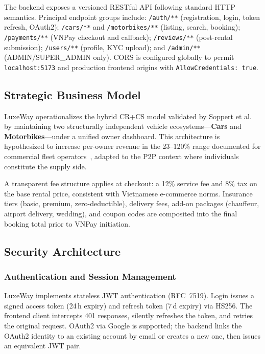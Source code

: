The backend exposes a versioned RESTful API following standard HTTP
semantics. Principal endpoint groups include: \texttt{/auth/**}
(registration, login, token refresh, OAuth2); \texttt{/cars/**} and
\texttt{/motorbikes/**} (listing, search, booking); \texttt{/payments/**}
(VNPay checkout and callback); \texttt{/reviews/**} (post-rental
submission); \texttt{/users/**} (profile, KYC upload); and
\texttt{/admin/**} (ADMIN/SUPER\_ADMIN only). CORS is configured
globally to permit \texttt{localhost:5173} and production frontend
origins with \texttt{AllowCredentials: true}.

\subsection{Strategic Business Model}

LuxeWay operationalizes the hybrid CR+CS model validated by Soppert
et al.~\cite{soppert2024benefit} by maintaining two structurally
independent vehicle ecosystems---\textbf{Cars} and
\textbf{Motorbikes}---under a unified owner dashboard. This architecture
is hypothesized to increase per-owner revenue in the 23--120\% range
documented for commercial fleet operators~\cite{soppert2024benefit},
adapted to the P2P context where individuals constitute the supply side.

A transparent fee structure applies at checkout: a 12\% service fee
and 8\% tax on the base rental price, consistent with Vietnamese
e-commerce norms. Insurance tiers (basic, premium, zero-deductible),
delivery fees, add-on packages (chauffeur, airport delivery, wedding),
and coupon codes are composited into the final booking total prior to
VNPay initiation.

\subsection{Security Architecture}

\subsubsection{Authentication and Session Management}

LuxeWay implements stateless JWT authentication (RFC~7519). Login
issues a signed access token (24\,h expiry) and refresh token (7\,d
expiry) via HS256. The frontend client intercepts 401 responses,
silently refreshes the token, and retries the original request.
OAuth2 via Google is supported; the backend links the OAuth2 identity
to an existing account by email or creates a new one, then issues an
equivalent JWT pair.

